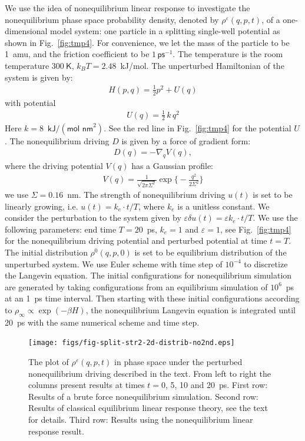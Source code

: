 \documentclass[]{tMPH2e}
\newcommand{\eps}{\varepsilon}
\begin{document}
We use the idea of nonequilibrium linear response to investigate the
nonequilibrium phase space probability density, denoted by $\rho^\eps(q, p, t)$, of a one-dimensional model system: one particle in a
splitting single-well potential as shown in Fig.~\ref{fig:tmp4}.  For convenience, we let the mass of
the particle to be 1~\textsf{amu}, and the friction coefficient to be
$1\,\textsf{ps}^{-1}$.
The temperature is the
room temperature $300\ \textsf{K}$, $k_BT = 2.48$~\textsf{kJ/mol}.
The unperturbed Hamiltonian of the system is
given by:
\begin{align}
  H ( p,  q) = \frac 12  p^2 + U( q) 
\end{align}
with potential
\begin{align}
  U( q) = \frac12\,k\, q^2 
\end{align}
Here $k = 8$~$\textsf{kJ} / (\textsf{mol nm}^2)$.
See the red line in Fig.~\ref{fig:tmp4} for the  potential $U$.
The nonequilibrium driving $ D$ is given by a force of gradient form:
\begin{align}
   D( q) = -\nabla_{ q} V( q) ,
\end{align}
where the driving potential $V( q)$ has a Gaussian profile:
\begin{align}
  V( q) = \frac{1}{\sqrt{2\pi \Sigma^2}}
  \exp\Big\{-\frac{ q^2}{2\Sigma^2}\Big\}
\end{align}
we use $\Sigma = 0.16$~\textsf{nm}.  The strength of nonequilibrium
driving $u(t)$ is set to be linearly growing, i.e. $ u(t) = k_e\cdot t/T$,
where $k_e$ is a unitless constant.
We
consider the perturbation to the system given by $\eps\delta u(t) = \eps k_e \cdot t/T$.
We use the following parameters: end time $T = 20$~\textsf{ps}, 
$k_e = 1$ and $\eps = 1$, see Fig.~\ref{fig:tmp4}
for the nonequilibrium driving potential and perturbed
potential at time $t = T$. The initial distribution $\rho^0(q, p, 0)$ is set to
be equilibrium distribution of the unperturbed system.
  We use Euler scheme with time step of $10^{-4}$ to discretize the
  Langevin equation. The initial configurations for nonequilibrium
  simulation are generated by taking configurations
  from an equilibrium simulation of $10^6$~\textsf{ps} at an 1~\textsf{ps} time interval.
  Then starting with these initial configurations according to $\rho_{\infty}\propto\exp(-\beta H)$,  the nonequilibrium
  Langevin equation is integrated until 20~\textsf{ps} with the same numerical
  scheme and time step.

\begin{figure}
  \centering
  \texttt{[image: figs/fig-split-str2-2d-distrib-no2nd.eps]}
  \caption{ The plot of $ \rho^\eps(q,p,t)$ in  phase
    space under the perturbed nonequilibrium driving described in the text. From left to right the columns present results at times $t =
    0$, 5, 10 and 20~\textsf{ps}.  First row: Results of a brute force
    nonequilibrium simulation. Second row: Results of
    classical equilibrium linear response theory, see the text for details. Third row: Results using the
    nonequilibrium linear response result.  }
  \label{fig:tmp6}
\end{figure}
\end{document}
